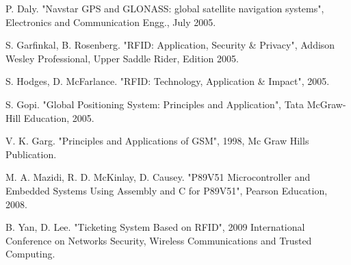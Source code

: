 \documentclass[conference]{IEEEtran}
\begin{document}
\begin{thebibliography}{99}
 P. Daly. "Navstar GPS and GLONASS: global satellite navigation systems", Electronics and Communication Engg., July 2005.

 S. Garfinkal, B. Rosenberg. "RFID: Application, Security \& Privacy", Addison Wesley Professional, Upper Saddle Rider, Edition 2005.

 S. Hodges, D. McFarlance. "RFID: Technology, Application \& Impact", 2005.

 S. Gopi. "Global Positioning System: Principles and Application", Tata McGraw-Hill Education, 2005.

 V. K. Garg. "Principles and Applications of GSM", 1998, Mc Graw Hills Publication.

 M. A. Mazidi, R. D. McKinlay, D. Causey. "P89V51 Microcontroller and Embedded Systems Using Assembly and C for P89V51", Pearson Education, 2008.

 B. Yan, D. Lee. "Ticketing System Based on RFID", 2009 International Conference on Networks Security, Wireless Communications and Trusted Computing.

\end{thebibliography}
\end{document}
